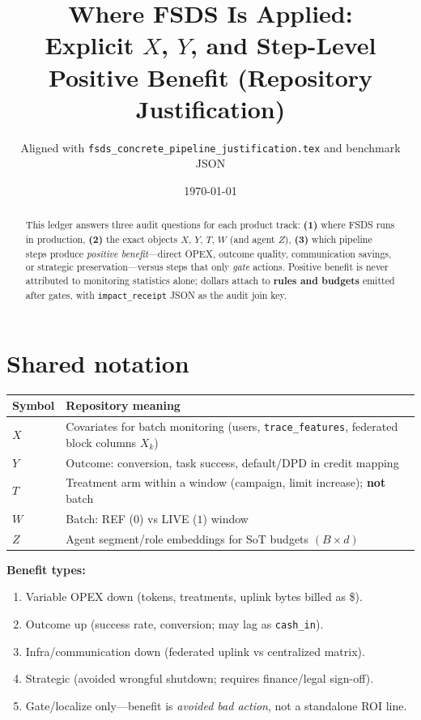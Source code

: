 \documentclass[11pt]{article}
\title{Where FSDS Is Applied:\\
Explicit $X$, $Y$, and Step-Level Positive Benefit (Repository Justification)}
\author{Aligned with \texttt{fsds\_concrete\_pipeline\_justification.tex} and benchmark JSON}
\date{\today}
\begin{document}
\maketitle

\begin{abstract}
This ledger answers three audit questions for each product track: \textbf{(1)} where FSDS runs in production, \textbf{(2)} the exact objects $X$, $Y$, $T$, $W$ (and agent $Z$), \textbf{(3)} which pipeline steps produce \emph{positive benefit}---direct OPEX, outcome quality, communication savings, or strategic preservation---versus steps that only \emph{gate} actions.
Positive benefit is never attributed to monitoring statistics alone; dollars attach to \textbf{rules and budgets} emitted after gates, with \texttt{impact\_receipt} JSON as the audit join key.
\end{abstract}

\section{Shared notation}
\begin{center}
\begin{tabular}{@{}ll@{}}
\toprule
Symbol & Repository meaning \\
\midrule
$X$ & Covariates for batch monitoring (users, \texttt{trace\_features}, federated block columns $X_k$) \\
$Y$ & Outcome: conversion, task success, default/DPD in credit mapping \\
$T$ & Treatment arm within a window (campaign, limit increase); \textbf{not} batch \\
$W$ & Batch: REF ($0$) vs LIVE ($1$) window \\
$Z$ & Agent segment/role embeddings for SoT budgets $(B\times d)$ \\
\bottomrule
\end{tabular}
\end{center}

\textbf{Benefit types:}
\begin{enumerate}[nosep]
  \item[\textbf{B1}] Variable OPEX down (tokens, treatments, uplink bytes billed as \$).
  \item[\textbf{B2}] Outcome up (success rate, conversion; may lag as \texttt{cash\_in}).
  \item[\textbf{B3}] Infra/communication down (federated uplink vs centralized matrix).
  \item[\textbf{B4}] Strategic (avoided wrongful shutdown; requires finance/legal sign-off).
  \item[\textbf{G}] Gate/localize only---benefit is \emph{avoided bad action}, not a standalone ROI line.
\end{enumerate}
\end{document}
